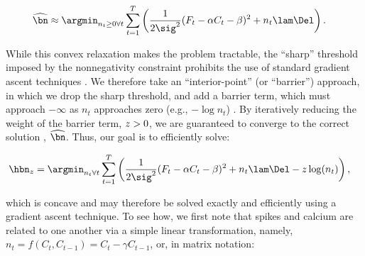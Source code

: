 \begin{align} \label{eq:obj2}
\hnm &\approx \an  \sum_{t=1}^T \left( \frac{1}{2 \sig^2}(F_t -\alpha C_t - \beta)^2  +  n_t  \lam \Del \right).
\end{align}

While this convex relaxation makes the problem tractable, the ``sharp'' threshold imposed by the nonnegativity constraint prohibits the use of standard gradient ascent techniques \cite{CONV04}. We therefore take an ``interior-point'' (or ``barrier'') approach, in which we drop the sharp threshold, and add a barrier term, which must approach $-\infty$ as $n_t$ approaches zero (e.g., $-\log n_t$) \cite{CONV04}.  By iteratively reducing the weight of the barrier term, $z > 0$, we are guaranteed to converge to the correct solution \cite{CONV04}, $\hnm$.  Thus, our goal is to efficiently solve:

\begin{align} \label{eq:eta}
\hbn_{\zzz} &= \argmin_{n_t \forall t}  \sum_{t=1}^T \left( \frac{1}{2 \sig^2}(F_t -\alpha C_t - \beta)^2  +  n_t  \lam \Del - \zzz \log(n_t) \right),
\end{align}

\noindent which is concave and may therefore be solved exactly and efficiently using a gradient ascent technique. To see how, we first note that   
spikes and calcium are related to one another via a simple linear transformation, namely, $n_t=f(C_t,C_{t-1})= C_t - \gamma C_{t-1}$, or, in matrix notation: 

